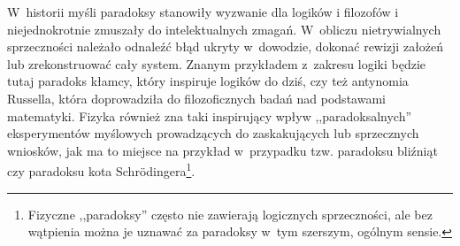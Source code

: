 W~historii myśli paradoksy stanowiły wyzwanie dla logików i filozofów i niejednokrotnie zmuszały do intelektualnych zmagań. W~obliczu nietrywialnych sprzeczności należało odnaleźć błąd ukryty w~dowodzie, dokonać rewizji założeń lub zrekonstruować cały system. Znanym przykładem z~zakresu logiki będzie tutaj paradoks kłamcy, który inspiruje logików do dziś, czy też antynomia Russella, która doprowadziła do filozoficznych badań nad podstawami matematyki. Fizyka również zna taki inspirujący wpływ ,,paradoksalnych'' eksperymentów myślowych prowadzących do zaskakujących lub sprzecznych wniosków, jak ma to miejsce na przykład w~przypadku tzw. paradoksu bliźniąt czy paradoksu kota Schrödingera\footnote{Fizyczne ,,paradoksy'' często nie zawierają logicznych sprzeczności, ale bez wątpienia można je uznawać za paradoksy w~tym szerszym, ogólnym sensie.}.

